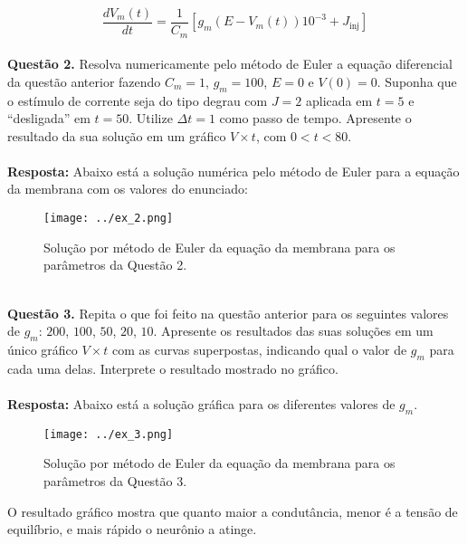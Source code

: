 \documentclass[portuguese,12pt,a4paper]{article}
\begin{document}
	$$\frac{dV_m(t)}{dt} = \frac{1}{C_m}[g_m(E - V_m(t))10^{-3} + J_{\text{inj}}]$$\\
	
	\noindent \textbf{Questão 2.} Resolva numericamente pelo método de Euler a equação diferencial da questão anterior fazendo $C_m = 1$, $g_m = 100$, $E = 0$ e $V(0) = 0$. Suponha que o estímulo de corrente seja do tipo degrau com $J = 2$ aplicada em $t = 5$ e ``desligada'' em $t = 50$. Utilize $\Delta t = 1$ como passo de tempo. Apresente o resultado da sua solução em um gráfico $V \times t$, com $0 < t < 80$.\\\\
	
	\noindent\textbf{Resposta:} Abaixo está a solução numérica pelo método de Euler para a equação da membrana com os valores do enunciado:
	
	
	
	\begin{figure}[H]
		\centering
		\texttt{[image: ../ex\_2.png]}
		\caption{Solução por método de Euler da equação da membrana para os parâmetros da Questão 2.\\\\}
	\end{figure}
	
	
	\noindent\textbf{Questão 3.} Repita o que foi feito na questão anterior para os seguintes valores de $g_m$: $200$, $100$, $50$, $20$, $10$. Apresente os resultados das suas soluções em um único gráfico $V \times t$ com as curvas superpostas, indicando qual o valor de $g_m$ para cada uma delas. Interprete o resultado mostrado no gráfico.\\\\
	
	\noindent\textbf{Resposta:} Abaixo está a solução gráfica para os diferentes valores de $g_m$.
	
	\begin{figure}[H]
		\centering
		\texttt{[image: ../ex\_3.png]}
		\caption{Solução por método de Euler da equação da membrana para os parâmetros da Questão 3.}
	\end{figure}
	
	O resultado gráfico mostra que quanto maior a condutância, menor é a tensão de equilíbrio, e mais rápido o neurônio a atinge.\\\\
	
\end{document}
